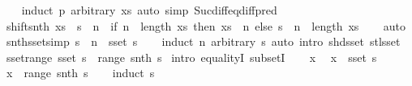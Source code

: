 \begin{isabellebody}
%
\isadelimproof
\ \ %
\endisadelimproof
%
\isatagproof
{}\isamarkupfalse%
\ {\isacharparenleft}induct\ p\ arbitrary{\isacharcolon}\ xs{\isacharparenright}\ {\isacharparenleft}auto\ simp{\isacharcolon}\ Suc{\isacharunderscore}diff{\isacharunderscore}eq{\isacharunderscore}diff{\isacharunderscore}pred{\isacharparenright}%
\endisatagproof
{\isafoldproof}%
%
\isadelimproof
\isanewline
%
\endisadelimproof
\isanewline
{}\isamarkupfalse%
\ shift{\isacharunderscore}snth{\isacharcolon}\ {\isachardoublequoteopen}{\isacharparenleft}xs\ {\isacharat}{\isacharminus}\ s{\isacharparenright}\ {\isacharbang}{\isacharbang}\ n\ {\isacharequal}\ {\isacharparenleft}if\ n\ {\isacharless}\ length\ xs\ then\ xs\ {\isacharbang}\ n\ else\ s\ {\isacharbang}{\isacharbang}\ {\isacharparenleft}n\ {\isacharminus}\ length\ xs{\isacharparenright}{\isacharparenright}{\isachardoublequoteclose}\isanewline
%
\isadelimproof
\ \ %
\endisadelimproof
%
\isatagproof
{}\isamarkupfalse%
\ auto%
\endisatagproof
{\isafoldproof}%
%
\isadelimproof
\isanewline
%
\endisadelimproof
\isanewline
{}\isamarkupfalse%
\ snth{\isacharunderscore}sset{\isacharbrackleft}simp{\isacharbrackright}{\isacharcolon}\ {\isachardoublequoteopen}s\ {\isacharbang}{\isacharbang}\ n\ {\isasymin}\ sset\ s{\isachardoublequoteclose}\isanewline
%
\isadelimproof
\ \ %
\endisadelimproof
%
\isatagproof
{}\isamarkupfalse%
\ {\isacharparenleft}induct\ n\ arbitrary{\isacharcolon}\ s{\isacharparenright}\ {\isacharparenleft}auto\ intro{\isacharcolon}\ shd{\isacharunderscore}sset\ stl{\isacharunderscore}sset{\isacharparenright}%
\endisatagproof
{\isafoldproof}%
%
\isadelimproof
\isanewline
%
\endisadelimproof
\isanewline
{}\isamarkupfalse%
\ sset{\isacharunderscore}range{\isacharcolon}\ {\isachardoublequoteopen}sset\ s\ {\isacharequal}\ range\ {\isacharparenleft}snth\ s{\isacharparenright}{\isachardoublequoteclose}\isanewline
%
\isadelimproof
%
\endisadelimproof
%
\isatagproof
{}\isamarkupfalse%
\ {\isacharparenleft}intro\ equalityI\ subsetI{\isacharparenright}\isanewline
\ \ \isamarkupfalse%
\ x\ \isamarkupfalse%
\ {\isachardoublequoteopen}x\ {\isasymin}\ sset\ s{\isachardoublequoteclose}\isanewline
\ \ \isamarkupfalse%
\ {\isachardoublequoteopen}x\ {\isasymin}\ range\ {\isacharparenleft}snth\ s{\isacharparenright}{\isachardoublequoteclose}\isanewline
\ \ \isamarkupfalse%
\ {\isacharparenleft}induct\ s{\isacharparenright}\isanewline
\ \ \ \ \isamarkupfalse%

\end{isabellebody}
